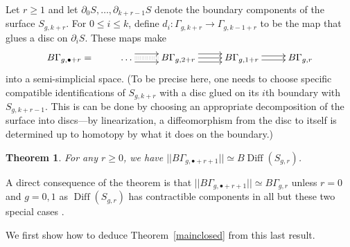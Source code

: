 \documentclass[10pt]{amsart}
\newtheorem{thm}{Theorem}[section]
\newcommand{\Ga}{\Gamma}
\newcommand{\del}{\partial}
\newcommand{\Dif}{\operatorname{Diff}}
\begin{document}
\smallskip

Let $r\ge 1$ and let  $\del_0S,\dots,\del_{k+r-1} S$ denote the boundary components of the surface $S_{g,k+r}$.  
For $0\le i\le k$, define $d_i\colon \Ga_{g,k+r}\to \Ga_{g,k-1+r}$ to be the map that glues a disc on $\del_iS$. 
These maps make 
$$\xymatrix{B\Ga_{g,\bullet+r}=& \dots\ar@{:}[r] \ar@<1ex>[r] \ar@<-1ex>[r] &  B\Ga_{g,2+r}\ar[r] \ar@<1ex>[r] \ar@<-1ex>[r]& B\Ga_{g,1+r}\ar@<.5ex>[r] \ar@<-.5ex>[r] &  B\Ga_{g,r}}$$
into a semi-simplicial space. (To be precise here, one needs to choose specific compatible identifications of $S_{g,k+r}$ with a disc
glued on its $i$th boundary with $S_{g,k+r-1}$. This is can be done by choosing an appropriate decomposition of the surface into
discs---by linearization, a diffeomorphism from the disc to itself is determined up to homotopy by what
it does on the boundary.) 



\begin{thm}\cite{RW09}\label{resolution}
For any $r\ge 0$, we have  $||B\Ga_{g,\bullet+r+1}||\simeq B\Dif(S_{g,r})$.
\end{thm}

A direct consequence of the theorem is  that 
 $||B\Ga_{g,\bullet+r+1}||\simeq B\Ga_{g,r}$ unless $r=0$ and $g=0,1$ as $\Dif(S_{g,r})$ has contractible components in all but these
 two special cases  \cite{EE,ES}. 

\smallskip

We first show how to deduce Theorem~\ref{mainclosed} from this last result. 
\end{document}
